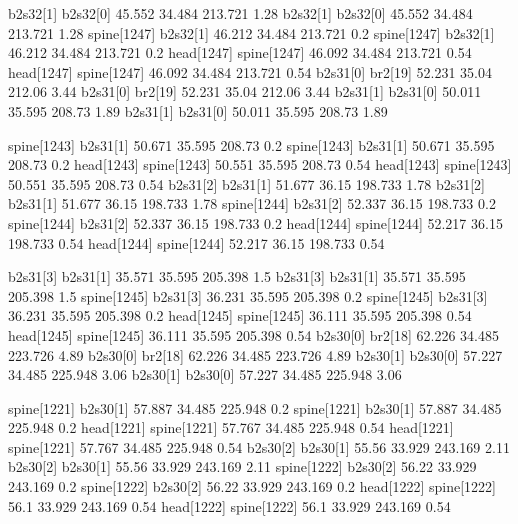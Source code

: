 b2s32[1]    b2s32[0]    45.552    34.484    213.721    1.28
b2s32[1]    b2s32[0]    45.552    34.484    213.721    1.28
spine[1247]    b2s32[1]    46.212    34.484    213.721    0.2
spine[1247]    b2s32[1]    46.212    34.484    213.721    0.2
head[1247]    spine[1247]    46.092    34.484    213.721    0.54
head[1247]    spine[1247]    46.092    34.484    213.721    0.54
b2s31[0]    br2[19]    52.231    35.04    212.06    3.44
b2s31[0]    br2[19]    52.231    35.04    212.06    3.44
b2s31[1]    b2s31[0]    50.011    35.595    208.73    1.89
b2s31[1]    b2s31[0]    50.011    35.595    208.73    1.89


spine[1243]    b2s31[1]    50.671    35.595    208.73    0.2
spine[1243]    b2s31[1]    50.671    35.595    208.73    0.2
head[1243]    spine[1243]    50.551    35.595    208.73    0.54
head[1243]    spine[1243]    50.551    35.595    208.73    0.54
b2s31[2]    b2s31[1]    51.677    36.15    198.733    1.78
b2s31[2]    b2s31[1]    51.677    36.15    198.733    1.78
spine[1244]    b2s31[2]    52.337    36.15    198.733    0.2
spine[1244]    b2s31[2]    52.337    36.15    198.733    0.2
head[1244]    spine[1244]    52.217    36.15    198.733    0.54
head[1244]    spine[1244]    52.217    36.15    198.733    0.54


b2s31[3]    b2s31[1]    35.571    35.595    205.398    1.5
b2s31[3]    b2s31[1]    35.571    35.595    205.398    1.5
spine[1245]    b2s31[3]    36.231    35.595    205.398    0.2
spine[1245]    b2s31[3]    36.231    35.595    205.398    0.2
head[1245]    spine[1245]    36.111    35.595    205.398    0.54
head[1245]    spine[1245]    36.111    35.595    205.398    0.54
b2s30[0]    br2[18]    62.226    34.485    223.726    4.89
b2s30[0]    br2[18]    62.226    34.485    223.726    4.89
b2s30[1]    b2s30[0]    57.227    34.485    225.948    3.06
b2s30[1]    b2s30[0]    57.227    34.485    225.948    3.06


spine[1221]    b2s30[1]    57.887    34.485    225.948    0.2
spine[1221]    b2s30[1]    57.887    34.485    225.948    0.2
head[1221]    spine[1221]    57.767    34.485    225.948    0.54
head[1221]    spine[1221]    57.767    34.485    225.948    0.54
b2s30[2]    b2s30[1]    55.56    33.929    243.169    2.11
b2s30[2]    b2s30[1]    55.56    33.929    243.169    2.11
spine[1222]    b2s30[2]    56.22    33.929    243.169    0.2
spine[1222]    b2s30[2]    56.22    33.929    243.169    0.2
head[1222]    spine[1222]    56.1    33.929    243.169    0.54
head[1222]    spine[1222]    56.1    33.929    243.169    0.54


